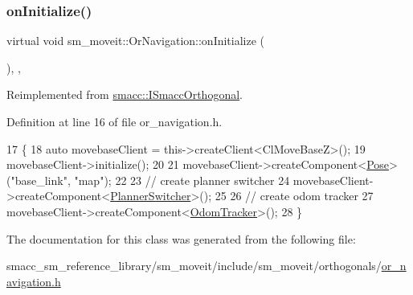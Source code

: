 \subsubsection{\texorpdfstring{on\+Initialize()}{onInitialize()}}
{\footnotesize\ttfamily virtual void sm\+\_\+moveit\+::\+Or\+Navigation\+::on\+Initialize (\begin{DoxyParamCaption}{ }\end{DoxyParamCaption})\hspace{0.3cm}{\ttfamily [inline]}, {\ttfamily [override]}, {\ttfamily [virtual]}}



Reimplemented from \hyperlink{classsmacc_1_1ISmaccOrthogonal_a6bb31c620cb64dd7b8417f8705c79c7a}{smacc\+::\+I\+Smacc\+Orthogonal}.



Definition at line 16 of file or\+\_\+navigation.\+h.


\begin{DoxyCode}
17     \{
18         \textcolor{keyword}{auto} movebaseClient = this->createClient<ClMoveBaseZ>();
19         movebaseClient->initialize();
20 
21         movebaseClient->createComponent<\hyperlink{classcl__move__base__z_1_1Pose}{Pose}>(\textcolor{stringliteral}{"base\_link"}, \textcolor{stringliteral}{"map"});
22 
23         \textcolor{comment}{// create planner switcher}
24         movebaseClient->createComponent<\hyperlink{classcl__move__base__z_1_1PlannerSwitcher}{PlannerSwitcher}>();
25 
26         \textcolor{comment}{// create odom tracker}
27         movebaseClient->createComponent<\hyperlink{classcl__move__base__z_1_1odom__tracker_1_1OdomTracker}{OdomTracker}>();
28     \}
\end{DoxyCode}


The documentation for this class was generated from the following file\+:\begin{DoxyCompactItemize}
\item 
smacc\+\_\+sm\+\_\+reference\+\_\+library/sm\+\_\+moveit/include/sm\+\_\+moveit/orthogonals/\hyperlink{sm__moveit_2include_2sm__moveit_2orthogonals_2or__navigation_8h}{or\+\_\+navigation.\+h}\end{DoxyCompactItemize}
